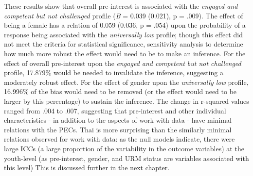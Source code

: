 \documentclass[]{book}
\theoremstyle{definition}
\theoremstyle{definition}
\theoremstyle{definition}
\theoremstyle{remark}
\begin{document}
These results show that overall pre-interest is associated with the
\emph{engaged and competent but not challenged} profile (\emph{B} =
0.039 (0.021), p = .009). The effect of being a female has a relation of
0.059 (0.036, p = .054) upon the probability of a response being
associated with the \emph{universally low} profile; though this effect
did not meet the criteria for statistical significance, sensitivity
analysis to determine how much more robust the effect would need to be
to make an inference. For the effect of overall pre-interest upon the
\emph{engaged and competent but not challenged} profile, 17.879\% would
be needed to invalidate the inference, suggesting a moderately robust
effect. For the effect of gender upon the \emph{universally low}
profile, 16.996\% of the bias would need to be removed (or the effect
would need to be larger by this percentage) to sustain the inference.
The change in r-squared values ranged from .004 to .007, suggesting that
pre-interest and other individual characteristics - in addition to the
aspects of work with data - have minimal relations with the PECs. Thai
is more surprising than the similarly minimal relations observed for
work with data: as the null models indicate, there were large ICCs (a
large proportion of the variability in the outcome variables) at the
youth-level (as pre-interest, gender, and URM status are variables
associated with this level) This is discussed further in the next
chapter.
\end{document}

